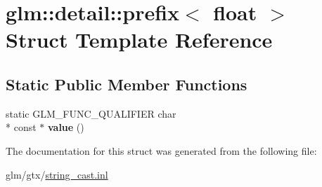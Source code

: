 \hypertarget{structglm_1_1detail_1_1prefix_3_01float_01_4}{\section{glm\-:\-:detail\-:\-:prefix$<$ float $>$ Struct Template Reference}
\label{structglm_1_1detail_1_1prefix_3_01float_01_4}
}
\subsection*{Static Public Member Functions}
\begin{DoxyCompactItemize}
\item 
\hypertarget{structglm_1_1detail_1_1prefix_3_01float_01_4_a106cde8d6d62001a05cbf21367467591}{static G\-L\-M\-\_\-\-F\-U\-N\-C\-\_\-\-Q\-U\-A\-L\-I\-F\-I\-E\-R char \\*
const $\ast$ {\bfseries value} ()}\label{structglm_1_1detail_1_1prefix_3_01float_01_4_a106cde8d6d62001a05cbf21367467591}

\end{DoxyCompactItemize}


The documentation for this struct was generated from the following file\-:\begin{DoxyCompactItemize}
\item 
glm/gtx/\hyperlink{string__cast_8inl}{string\-\_\-cast.\-inl}\end{DoxyCompactItemize}

